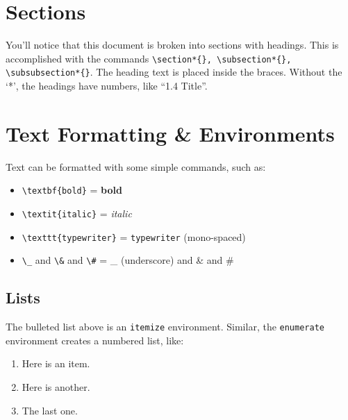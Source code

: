 \documentclass[11pt]{article}
\begin{document}
\section*{Sections}

You'll notice that this document is broken into sections with headings.  This is accomplished with the commands \verb|\section*{}, \subsection*{}, \subsubsection*{}|.  The heading text is placed inside the braces.  Without the `*', the headings have numbers, like ``1.4 Title''.



\section*{Text Formatting \& Environments}

Text can be formatted with some simple commands, such as:

\begin{itemize}
	\item \verb|\textbf{bold}| = \textbf{bold}
	\item \verb|\textit{italic}| = \textit{italic}
	\item \verb|\texttt{typewriter}| = \texttt{typewriter} (mono-spaced)
	\item \verb|\_| and \verb|\&| and \verb|\#| = \_ (underscore) and \& and \#
\end{itemize}

\subsection*{Lists}

The bulleted list above is an \texttt{itemize} environment.  Similar, the \texttt{enumerate} environment creates a numbered list, like:

\begin{enumerate}
	\item Here is an item.
	\item Here is another.
	\item The last one.
\end{enumerate}
\end{document}

